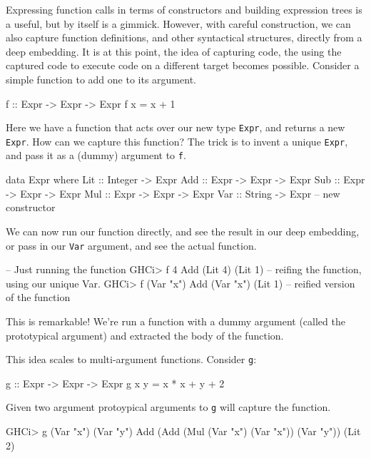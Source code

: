 \documentclass[11pt]{article}
\begin{document}
Expressing function calls in terms of constructors and
building expression trees is a useful, but by itself is a gimmick. 
However, with careful construction, we can also capture function definitions,
and other syntactical structures,
directly from a deep embedding. It is at this
point, the idea of capturing code,
the using the captured code to execute code
on a different target becomes possible.
Consider a simple function to add one to its argument.

\begin{Code}

f :: Expr -> Expr -> Expr
f x = x + 1
        
\end{Code}

Here we have a function that acts over our new type
\verb|Expr|, and returns a new \verb|Expr|. How can we capture
this function?
The trick is to invent a unique \verb|Expr|, and pass it as a (dummy) argument
to \verb|f|.

\begin{Code}
data Expr where
  Lit :: Integer -> Expr
  Add :: Expr -> Expr -> Expr
  Sub :: Expr -> Expr -> Expr
  Mul :: Expr -> Expr -> Expr
  Var :: String -> Expr    -- new constructor
\end{Code}        

We can now run our function directly, and see the result in our deep embedding, or
pass in our \verb|Var| argument, and see the actual function.

\begin{Code}
-- Just running the function
GHCi> f 4
Add (Lit 4) (Lit 1)
-- reifing the function, using our unique Var.
GHCi> f (Var "x")
Add (Var "x") (Lit 1)   -- reified version of the function
\end{Code}

This is remarkable! We're run a function with 
a dummy argument (called the prototypical argument)
and extracted the body of the function.

This idea scales to multi-argument functions. Consider \verb|g|:

\begin{Code}

g :: Expr -> Expr -> Expr
g x y = x * x + y + 2

\end{Code}

Given two argument protoypical arguments to \verb|g| will capture the function.

\begin{Code}
GHCi> g (Var "x") (Var "y")
Add (Add (Mul (Var "x") (Var "x")) (Var "y")) (Lit 2)
\end{Code}
\end{document}
